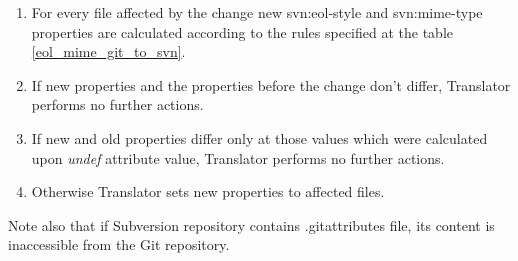 \begin{enumerate}
\compactlist
\item For every file affected by the change new svn:eol-style and svn:mime-type properties are calculated according to the rules specified at the table \ref{eol_mime_git_to_svn}.\\
\item If new properties and the properties before the change don't differ, Translator performs no further actions.\\
\item If new and old properties differ only at those values which were calculated upon \emph{undef} attribute value, Translator performs no further actions.\\
\item Otherwise Translator sets new properties to affected files.\\
\end{enumerate}

Note also that if Subversion repository contains .gitattributes file, its content is inaccessible from the Git repository.

